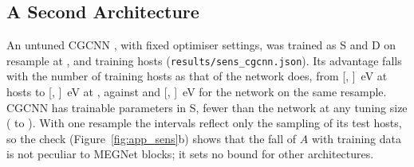 \subsection{A Second Architecture}

An untuned CGCNN \citep{Xie2018crystal}, with fixed optimiser settings, was trained as S and D on resample \numSensCgcnnResample{} at \numSensCgcnnBudgetsItemOne{}, \numSensCgcnnBudgetsItemTwo{} and \numSensCgcnnBudgetsItemThree{} training hosts (\texttt{results/sens\_cgcnn.json}). Its advantage falls with the number of training hosts as that of the network does, from \numSensCgcnnTableCgcnnFiftyAPoint{} [\numSensCgcnnTableCgcnnFiftyACiNinetyFiveItemOne{}, \numSensCgcnnTableCgcnnFiftyACiNinetyFiveItemTwo{}]~eV at \numSensCgcnnBudgetsItemOne{} hosts to \numSensCgcnnTableCgcnnSixHundredFiftyFourAPoint{} [\numSensCgcnnTableCgcnnSixHundredFiftyFourACiNinetyFiveItemOne{}, \numSensCgcnnTableCgcnnSixHundredFiftyFourACiNinetyFiveItemTwo{}]~eV at \numSensCgcnnBudgetsItemThree{}, against \numSensCgcnnTableMegnetVTwoFiftyAPoint{} and \numSensCgcnnTableMegnetVTwoSixHundredFiftyFourAPoint{} [\numSensCgcnnTableMegnetVTwoSixHundredFiftyFourACiNinetyFiveItemOne{}, \numSensCgcnnTableMegnetVTwoSixHundredFiftyFourACiNinetyFiveItemTwo{}]~eV for the network on the same resample. CGCNN has \numSensCgcnnParameterCountsCgcnnCgcnnSSixHundredFiftyFour{} trainable parameters in S, fewer than the network at any tuning size (\numSensCgcnnParameterCountsMegnetVTwoSTwoHundred{} to \numSensCgcnnParameterCountsMegnetVTwoSSixHundredFiftyFour{}). With one resample the intervals reflect only the sampling of its test hosts, so the check (Figure~\ref{fig:app_sens}b) shows that the fall of $A$ with training data is not peculiar to MEGNet blocks; it sets no bound for other architectures.
